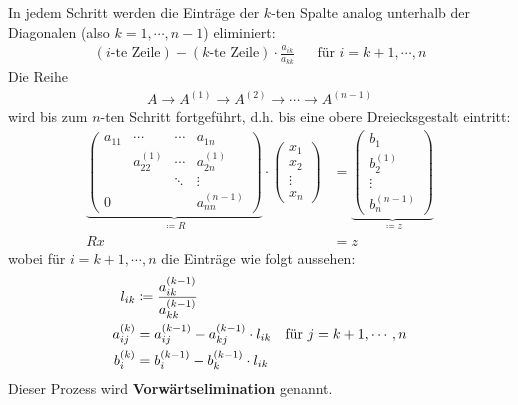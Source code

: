 In jedem Schritt werden die Einträge der $k$-ten Spalte analog 
unterhalb der Diagonalen (also $k=1, \cdots, n-1$) eliminiert:
\begin{align*}
  (\text{$i$-te Zeile})- (\text{$k$-te Zeile})\cdot\frac{a_{ik}}{a_{kk}}
  && \text{für } i=k+1, \cdots ,n 
\end{align*}
Die Reihe 
\begin{gather*}
  A \rightarrow A^{(1)} \rightarrow A^{(2)} \rightarrow \dotsm \rightarrow A^{(n-1)}
\end{gather*}
wird bis zum $n$-ten Schritt fortgeführt, d.h. bis eine obere Dreiecksgestalt eintritt:
\begin{align}
  \nonumber
  \underbrace{	\begin{pmatrix}
      a_{11} & \dotsm & \dotsm & a_{1n} \\
      & a_{22}^{(1)} & \dotsm & a_{2n}^{(1)} \\
      &&              \ddots  &  \vdots \\
      0        && &                             a_{nn}^{(n-1)}
    \end{pmatrix}}_{\coloneqq R}
                    \cdot
                    \begin{pmatrix}
                      x_1 \\
                      x_2 \\
                      \vdots \\
                      x_n
                    \end{pmatrix}
             & =
               \underbrace{\begin{pmatrix}
                   b_1 \\
                   b_2^{(1)} \\
                   \vdots \\
                   b_n^{(n-1)}
                 \end{pmatrix}}_{\coloneqq z} \\
  Rx &= z 	\label{II.1.1} 
\end{align}
wobei für  $i=k+1, \cdots ,n$ die Einträge wie folgt aussehen:
\begin{align}	
  l_{ik} &\coloneqq \frac{a_{ik}^{(k-1)}}{a_{kk}^{(k-1)}} \label{II.1.2} \\
  a_{ij}^{(k)} &= a_{ij}^{(k-1)} - a_{kj}^{(k-1)}\cdot l_{ik} \label{II.1.3}
               & \text{für } j=k+1, \cdots , n\\ %
  b_i^{(k)} &= b_i^{(k-1)} -b_k^{(k-1)} \cdot   l_{ik}
              \label{II.1.4}\index{Vorwärtssubstitution}
\end{align}
Dieser Prozess wird \textbf{Vorwärtselimination} genannt.\\

